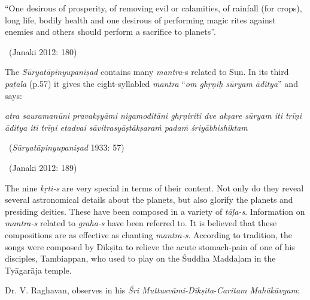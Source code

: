 \begin{myquote}
“One desirous of prosperity, of removing evil or calamities, of rainfall (for crops), long life, bodily health and one desirous of performing magic rites against enemies and others should perform a sacrifice to planets”.

~\hfill (Janaki 2012: 180)
\end{myquote}

The \textit{Sūryatāpinyupaniṣad} contains many \textit{mantra}-s related to Sun. In its third \textit{paṭala} (p.57) it gives the eight-syllabled \textit{mantra} “\textit{om ghṛṇiḥ sūryam āditya}” and says:

\begin{myquote}
\textit{atra sauramanūni pravakṣyāmi nigamoditāni  ghṛṇiriti dve akṣare  sūryam iti trīṇi  āditya iti trīṇi  etadvai sāvitrasyāṣtākṣaraṁ padaṁ śriyābhishiktam } 

~\hfill (\textit{Sūryatāpinyupaniṣad} 1933: 57)
\end{myquote}

\vspace{-.1cm}

\begin{myquote}

~\hfill (Janaki 2012: 189)
\end{myquote}

The nine \textit{kṛti-s} are very special in terms of their content. Not only do they reveal several astronomical details about the planets, but also glorify the planets and presiding deities. These have been composed in a variety of \textit{tāḷa-s}. Information on \textit{mantra-s} related to \textit{graha-s} have been referred to. It is believed that these compositions are as effective as chanting \textit{mantra-s}. According to tradition, the songs were composed by Dīkṣita to relieve the acute stomach-pain of one of his disciples, Tambiappan, who used to play on the Śuddha Maddaḷam in the Tyāgarāja temple.

Dr. V. Raghavan, observes in his \textit{Śri Muttusvāmi-Dīkṣita}-\textit{Caritam Mahā\-kāvyam}:

